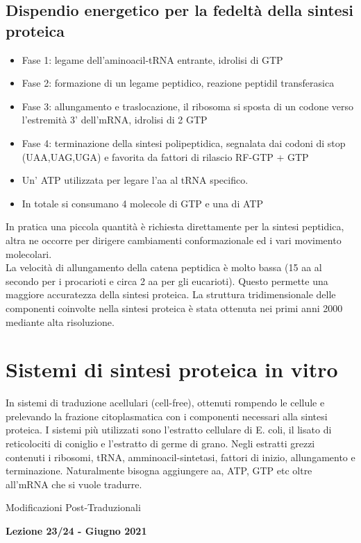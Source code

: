 \documentclass{article}
\begin{document}
\subsection{Dispendio energetico per la fedeltà della sintesi proteica}
\begin{itemize}
    \item Fase 1: legame dell'aminoacil-tRNA entrante, idrolisi di GTP
    \item Fase 2: formazione di un legame peptidico, reazione peptidil transferasica
    \item Fase 3: allungamento e traslocazione, il ribosoma si sposta di un codone
    verso l'estremità 3' dell'mRNA, idrolisi di 2 GTP
    \item Fase 4: terminazione della sintesi polipeptidica, segnalata dai codoni di
    stop (UAA,UAG,UGA) e favorita da fattori di rilascio RF-GTP + GTP
    \item Un' ATP utilizzata per legare l'aa al tRNA specifico.
    \item In totale si consumano 4 molecole di GTP e una di ATP
\end{itemize}
In pratica una piccola quantità è richiesta direttamente per la sintesi peptidica, altra ne occorre per dirigere cambiamenti conformazionale ed i vari movimento molecolari.\\ La velocità di allungamento della catena peptidica è molto bassa (15 aa al secondo per i
procarioti e circa 2 aa per gli eucarioti). Questo permette una maggiore accuratezza della sintesi proteica. La struttura tridimensionale delle componenti coinvolte nella sintesi proteica è stata ottenuta nei primi anni 2000
mediante alta risoluzione.
\section{Sistemi di sintesi proteica in vitro}
In sistemi di traduzione acellulari (cell-free), ottenuti rompendo le cellule e prelevando la frazione
citoplasmatica con i componenti necessari alla sintesi proteica. I sistemi più utilizzati sono l'estratto cellulare di E. coli, il lisato di reticolociti di coniglio e l'estratto di germe di grano.
Negli estratti grezzi contenuti i ribosomi, tRNA, amminoacil-sintetasi, fattori di inizio, allungamento e terminazione. Naturalmente bisogna aggiungere aa, ATP, GTP etc oltre all'mRNA che si vuole tradurre.



\begin{titlepage}
    \begin{center}
        \vspace*{1cm}
        \huge
        Modificazioni Post-Traduzionali
            
        \vspace{1.5cm}
        
        \Large
        \textbf{Lezione 23/24 - Giugno 2021}

        \vspace{0.8cm}

    \end{center}
\end{titlepage}
\setcounter{page}{96}
\end{document}
